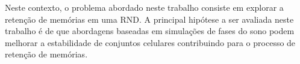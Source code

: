 Neste contexto, o problema abordado neste trabalho consiste em explorar a retenção de memórias em uma RND. A principal hipótese a
ser avaliada neste trabalho é de que abordagens baseadas em simulações de fases do sono podem melhorar a estabilidade de conjuntos
celulares contribuindo para o processo de retenção de memórias.





